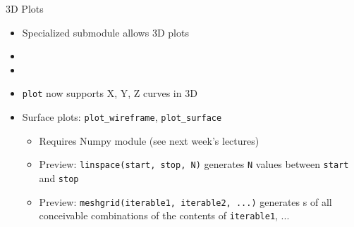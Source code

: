 \begin{frame}[fragile]{3D Plots}
%
\begin{itemize}
\item Specialized submodule allows 3D plots
\item {}
\item {}
\item \texttt{plot} now supports X, Y, Z \Thus curves in 3D
\item Surface plots: \texttt{plot\_wireframe}, \texttt{plot\_surface}
	\begin{itemize}
	\item Requires Numpy module (see next week's lectures)
	\item Preview: \texttt{linspace(start, stop, N)} generates \texttt{N} values between \texttt{start} and \texttt{stop}
	\item Preview: \texttt{meshgrid(iterable1, iterable2, ...)} generates s of all conceivable combinations of the contents of \texttt{iterable1}, ...
	\end{itemize}
\end{itemize}
%
\end{frame}


